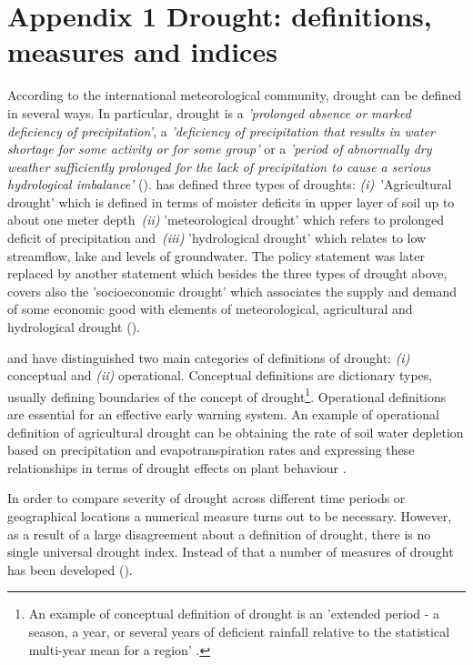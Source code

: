 \documentclass[a4paper,12pt]{article}
\begin{document}
\section{Appendix 1 Drought: definitions, measures and indices}
According to the international meteorological community, drought can be defined in several ways. In particular, drought is a \textit{'prolonged absence or marked deficiency of precipitation'}, a \textit{'deficiency of precipitation that results in water shortage for some activity or for some group'} or a \textit{'period of abnormally dry weather sufficiently prolonged for the lack of precipitation to cause a serious hydrological imbalance'} (\citealp{Heim2002, IPCCtrenberth}).
 \cite{AMS1997} has defined three types of droughts: \textit{(i)}~'Agricultural drought' which is defined in terms of moister deficits in upper layer of soil up to about one meter depth~\textit{(ii)} 'meteorological drought' which refers to prolonged deficit of precipitation and~\textit{(iii)} 'hydrological drought' which relates to low streamflow, lake and levels of groundwater. The  \cite{AMS1997} policy statement was later replaced by another statement \citep{AMS2013} which besides the three types of drought above, covers also the 'socioeconomic drought' which associates the supply and demand of some economic good with elements of meteorological, agricultural and hydrological drought (\citealt{Heim2002, IPCCtrenberth}).
 
\cite{wilhite1985} and \cite{wilhite2000} have distinguished two main categories of definitions of drought: \textit{(i)} conceptual and \textit{(ii)} operational. Conceptual definitions are dictionary types, usually defining boundaries of the concept of drought\footnote{An example of conceptual definition of drought is an 'extended period - a season, a year, or several years of deficient rainfall relative to the statistical multi-year mean for a region' \cite{schneider1996}.}. Operational definitions are essential for an effective early warning system. An example of operational definition of agricultural drought can be obtaining the rate of soil water depletion based on precipitation and evapotranspiration rates and expressing these relationships in terms of drought effects on plant behaviour \citep{wilhite2000}.

In order to compare severity of drought across different time periods or geographical locations a numerical measure turns out to be necessary. However, as a result of a large disagreement about a definition of drought, there is no single universal drought index. Instead of that a number of measures of drought has been developed (\citealp{ wilhite1985, wilhite2000, Heim2002}).
\end{document}
